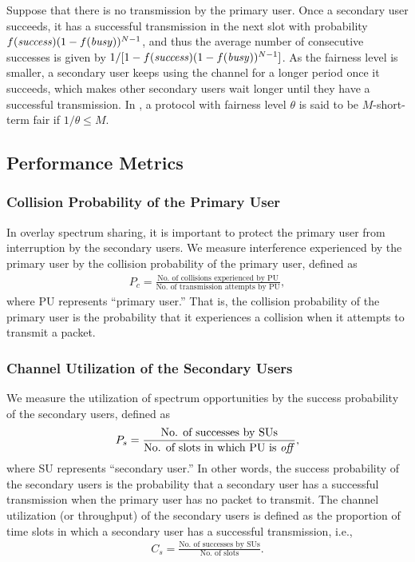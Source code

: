 \documentclass[12pt,draftclsnofoot,onecolumn]{IEEEtran}
\begin{document}
Suppose that there is no transmission by the primary user. Once a secondary user succeeds, it has a successful transmission in the next
slot with probability $f(\textrm{\emph{success}}) (1-f(\textrm{\emph{busy}}))^{N-1}$, and thus the average
number of consecutive successes is given by $1/[1-f(\textrm{\emph{success}}) (1-f(\textrm{\emph{busy}}))^{N-1}]$.
As the fairness level is smaller, a secondary user keeps using
the channel for a longer period once it succeeds, which makes other secondary users wait longer
until they have a successful transmission. In \cite{ma}, a protocol with fairness level $\theta$
is said to be $M$-short-term fair if $1/\theta \leq M$.

\subsection{Performance Metrics}

\subsubsection{Collision Probability of the Primary User}

In overlay spectrum sharing, it is important to protect the
primary user from interruption by the secondary users. We measure
interference experienced by the primary user by the collision probability
of the primary user, defined as
\begin{align*}
P_c = \frac{\textrm{No. of collisions experienced
by PU}}{\textrm{No. of transmission attempts by PU}},
\end{align*}
where PU represents ``primary user.'' That is, the collision probability
of the primary user is the probability that it experiences
a collision when it attempts to transmit a packet.

\subsubsection{Channel Utilization of the Secondary Users}

We measure the utilization of spectrum opportunities by
the success probability of the secondary users, defined as
\begin{align*}
P_s = \frac{\textrm{No. of successes by SUs}}{\textrm{No. of slots in which PU is \emph{off}}},
\end{align*}
where SU represents ``secondary user.'' In other words, the success probability of the secondary users
is the probability that a secondary user has a successful transmission
when the primary user has no packet to transmit.
The channel utilization (or throughput) of the secondary users is defined as the proportion of
time slots in which a secondary user has a successful transmission, i.e.,
\begin{align*}
C_s = \frac{\textrm{No. of successes by SUs}}{\textrm{No. of slots}}.
\end{align*}
\end{document}
